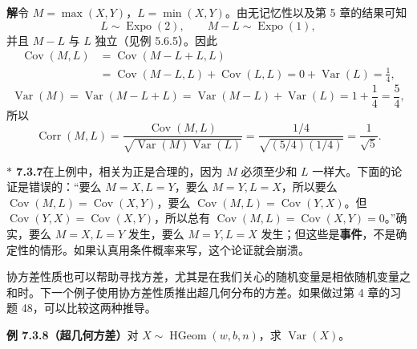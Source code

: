 \documentclass[UTF8, 12pt, fontset=fandol, oneside]{ctexart}
\newcommand{\biohazard}{\ensuremath{\ast}}
\begin{document}
\noindent\textbf{解}\quad 令 $M=\max(X,Y)$，$L=\min(X,Y)$。由无记忆性以及第 5 章的结果可知
\[
  L\sim \operatorname{Expo}(2),\qquad
  M-L\sim \operatorname{Expo}(1),
\]
并且 $M-L$ 与 $L$ 独立（见例 5.6.5）。因此
\[
\begin{aligned}
  \operatorname{Cov}(M,L)
  &=\operatorname{Cov}(M-L+L,L)\\
  &=\operatorname{Cov}(M-L,L)+\operatorname{Cov}(L,L)
  =0+\operatorname{Var}(L)=\frac14,
\end{aligned}
\]
\[
  \operatorname{Var}(M)
  =\operatorname{Var}(M-L+L)
  =\operatorname{Var}(M-L)+\operatorname{Var}(L)
  =1+\frac14=\frac54,
\]
所以
\[
  \operatorname{Corr}(M,L)
  =\frac{\operatorname{Cov}(M,L)}
  {\sqrt{\operatorname{Var}(M)\operatorname{Var}(L)}}
  =\frac{1/4}{\sqrt{(5/4)(1/4)}}=\frac{1}{\sqrt5}.
\]

\noindent\textbf{$\biohazard$ 7.3.7}\quad 在上例中，相关为正是合理的，因为 $M$ 必须至少和 $L$ 一样大。下面的论证是错误的：“要么 $M=X,L=Y$，要么 $M=Y,L=X$，所以要么 $\operatorname{Cov}(M,L)=\operatorname{Cov}(X,Y)$，要么 $\operatorname{Cov}(M,L)=\operatorname{Cov}(Y,X)$。但 $\operatorname{Cov}(Y,X)=\operatorname{Cov}(X,Y)$，所以总有 $\operatorname{Cov}(M,L)=\operatorname{Cov}(X,Y)=0$。”确实，要么 $M=X,L=Y$ 发生，要么 $M=Y,L=X$ 发生；但这些是\textbf{事件}，不是确定性的情形。如果认真用条件概率来写，这个论证就会崩溃。

协方差性质也可以帮助寻找方差，尤其是在我们关心的随机变量是相依随机变量之和时。下一个例子使用协方差性质推出超几何分布的方差。如果做过第 4 章的习题 48，可以比较这两种推导。

\noindent\textbf{例 7.3.8（超几何方差）}\quad 对 $X\sim \operatorname{HGeom}(w,b,n)$，求 $\operatorname{Var}(X)$。
\end{document}
